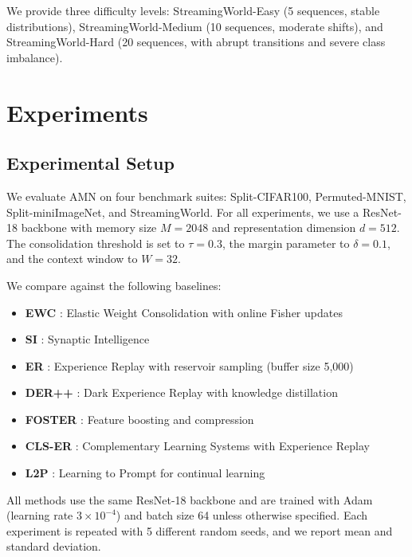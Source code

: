 \documentclass[11pt]{article}
\begin{document}
We provide three difficulty levels: StreamingWorld-Easy (5 sequences, stable distributions), StreamingWorld-Medium (10 sequences, moderate shifts), and StreamingWorld-Hard (20 sequences, with abrupt transitions and severe class imbalance).

\section{Experiments}
\label{sec:experiments}

\subsection{Experimental Setup}

We evaluate AMN on four benchmark suites: Split-CIFAR100, Permuted-MNIST, Split-miniImageNet, and StreamingWorld. For all experiments, we use a ResNet-18 backbone with memory size $M = 2048$ and representation dimension $d = 512$. The consolidation threshold is set to $\tau = 0.3$, the margin parameter to $\delta = 0.1$, and the context window to $W = 32$.

We compare against the following baselines:
\begin{itemize}
    \item \textbf{EWC} \citep{kirkpatrick2017overcoming}: Elastic Weight Consolidation with online Fisher updates
    \item \textbf{SI} \citep{zenke2017continual}: Synaptic Intelligence
    \item \textbf{ER} \citep{rolnick2019experience}: Experience Replay with reservoir sampling (buffer size 5,000)
    \item \textbf{DER++} \citep{buzzega2020dark}: Dark Experience Replay with knowledge distillation
    \item \textbf{FOSTER} \citep{wang2022foster}: Feature boosting and compression
    \item \textbf{CLS-ER} \citep{arani2022learning}: Complementary Learning Systems with Experience Replay
    \item \textbf{L2P} \citep{wang2022learning}: Learning to Prompt for continual learning
\end{itemize}

All methods use the same ResNet-18 backbone and are trained with Adam (learning rate $3 \times 10^{-4}$) and batch size 64 unless otherwise specified. Each experiment is repeated with 5 different random seeds, and we report mean and standard deviation.
\end{document}

